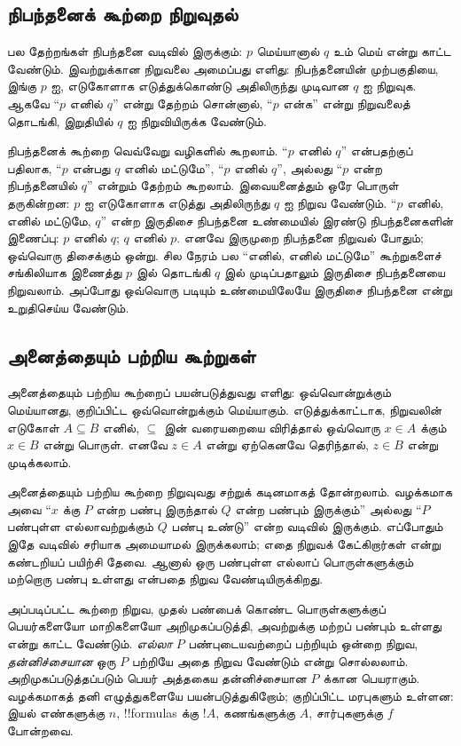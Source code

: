 \documentclass[../../../include/open-logic-section]{subfiles}
\begin{document}
\subsection{நிபந்தனைக் கூற்றை நிறுவுதல்}

பல தேற்றங்கள் நிபந்தனை வடிவில் இருக்கும்: $p$ மெய்யானால்
$q$ உம் மெய் என்று காட்ட வேண்டும். இவற்றுக்கான
நிறுவலை அமைப்பது எளிது: நிபந்தனையின் முற்பகுதியை,
இங்கு $p$ ஐ, எடுகோளாக எடுத்துக்கொண்டு அதிலிருந்து
முடிவான $q$ ஐ நிறுவுக. ஆகவே ``$p$ எனில் $q$''
என்று தேற்றம் சொன்னால், ``$p$ என்க'' என்று நிறுவலைத்
தொடங்கி, இறுதியில் $q$ ஐ நிறுவியிருக்க வேண்டும்.

நிபந்தனைக் கூற்றை வெவ்வேறு வழிகளில் கூறலாம். ``$p$
எனில் $q$'' என்பதற்குப் பதிலாக, ``$p$ என்பது $q$
எனில் மட்டுமே'', ``$p$ எனில் $q$'', அல்லது ``$p$
என்ற நிபந்தனையில் $q$'' என்றும் தேற்றம் கூறலாம்.
இவையனைத்தும் ஒரே பொருள் தருகின்றன: $p$ ஐ எடுகோளாக
எடுத்து அதிலிருந்து $q$ ஐ நிறுவ வேண்டும். ``$p$
எனில், எனில் மட்டுமே, $q$'' என்ற இருதிசை நிபந்தனை
உண்மையில் இரண்டு நிபந்தனைகளின் இணைப்பு: $p$ எனில்
$q$; $q$ எனில் $p$. எனவே இருமுறை நிபந்தனை
நிறுவல் போதும்; ஒவ்வொரு திசைக்கும் ஒன்று. சில நேரம்
பல ``எனில், எனில் மட்டுமே'' கூற்றுகளைச் சங்கிலியாக
இணைத்து $p$ இல் தொடங்கி $q$ இல் முடிப்பதாலும்
இருதிசை நிபந்தனையை நிறுவலாம். அப்போது ஒவ்வொரு
படியும் உண்மையிலேயே இருதிசை நிபந்தனை என்று உறுதிசெய்ய
வேண்டும்.

\subsection{அனைத்தையும் பற்றிய கூற்றுகள்}

அனைத்தையும் பற்றிய கூற்றைப் பயன்படுத்துவது எளிது:
ஒவ்வொன்றுக்கும் மெய்யானது, குறிப்பிட்ட ஒவ்வொன்றுக்கும்
மெய்யாகும். எடுத்துக்காட்டாக, நிறுவலின் எடுகோள்
$A \subseteq B$ எனில், $\subseteq$ இன் வரையறையை
விரித்தால் ஒவ்வொரு $x \in A$ க்கும் $x \in B$ என்று
பொருள். எனவே $z \in A$ என்று ஏற்கெனவே தெரிந்தால்,
$z \in B$ என்று முடிக்கலாம்.

அனைத்தையும் பற்றிய கூற்றை நிறுவுவது சற்றுக் கடினமாகத்
தோன்றலாம். வழக்கமாக அவை ``$x$ க்கு $P$ என்ற
பண்பு இருந்தால் $Q$ என்ற பண்பும் இருக்கும்'' அல்லது
``$P$ பண்புள்ள எல்லாவற்றுக்கும் $Q$ பண்பு உண்டு'' என்ற வடிவில் இருக்கும்.
எப்போதும் இதே வடிவில் சரியாக அமையாமல் இருக்கலாம்;
எதை நிறுவக் கேட்கிறார்கள் என்று கண்டறியப் பயிற்சி தேவை.
ஆனால் ஒரு பண்புள்ள எல்லாப் பொருள்களுக்கும் மற்றொரு
பண்பு உள்ளது என்பதை நிறுவ வேண்டியிருக்கிறது.

அப்படிப்பட்ட கூற்றை நிறுவ, முதல் பண்பைக் கொண்ட
பொருள்களுக்குப் பெயர்களையோ மாறிகளையோ அறிமுகப்படுத்தி,
அவற்றுக்கு மற்றப் பண்பும் உள்ளது என்று காட்ட வேண்டும்.
\emph{எல்லா} $P$ பண்புடையவற்றைப் பற்றியும் ஒன்றை நிறுவ,
\emph{தன்னிச்சையான} ஒரு $P$ பற்றியே அதை நிறுவ வேண்டும்
என்று சொல்லலாம். அறிமுகப்படுத்தப்படும் பெயர் அத்தகைய
தன்னிச்சையான $P$ க்கான பெயராகும். வழக்கமாகத் தனி
எழுத்துகளையே பயன்படுத்துகிறோம்; குறிப்பிட்ட மரபுகளும்
உள்ளன: இயல் எண்களுக்கு $n$, !!{formula}s க்கு $!A$,
கணங்களுக்கு $A$, சார்புகளுக்கு $f$ போன்றவை.
\end{document}
